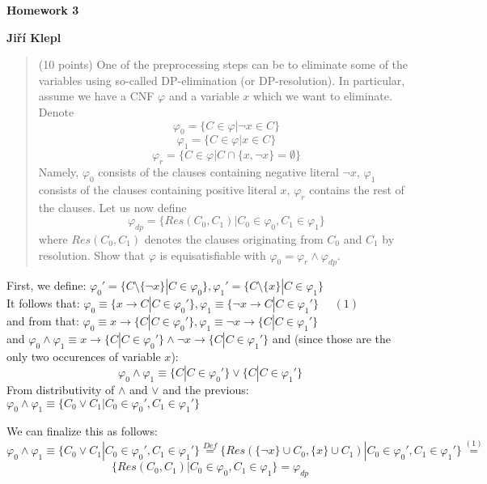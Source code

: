 \documentclass[a4paper,12pt]{article} %
\begin{document}
\begin{center}
    {\Large \bf Homework 3}
    \vspace{2mm}

    {\bf Jiří Klepl}

\end{center}

\vspace{0.4cm}

\begin{quote}
    (10 points) One of the preprocessing steps can be to eliminate some of the variables using so-called
DP-elimination (or DP-resolution). In particular, assume we have a CNF $\varphi$ and a variable $x$ which
we want to eliminate. Denote
$$\varphi_0 = \{C \in \varphi | \neg x \in C\}$$
$$\varphi_1 = \{C \in \varphi | x \in C\}$$
$$\varphi_r = \{C \in \varphi | C \cap \{x, \neg x\} = \emptyset\}$$
Namely, $\varphi_0$ consists of the clauses containing negative literal $\neg x$, $\varphi_1$ consists of the clauses containing
positive literal $x$, $\varphi_r$ contains the rest of the clauses. Let us now define
$$\varphi_{dp} = \{Res(C_0, C_1) | C_0 \in \varphi_0, C_1 \in \varphi_1\}$$
where $Res(C_0, C_1)$ denotes the clauses originating from $C_0$ and $C_1$ by resolution. Show that $\varphi$ is equisatisfiable with $\varphi_0 = \varphi_r \wedge \varphi_{dp}$.
\end{quote}

First, we define: $\varphi_0' = \{C \setminus \{\neg x\} | C \in \varphi_0\}, \varphi_1' = \{C \setminus \{x\} | C \in \varphi_1\}$ \\
It follows that: $\varphi_0 \equiv \{x \to C  | C \in \varphi_0'\}, \varphi_1 \equiv \{\neg x \to C | C \in \varphi_1'\}$ $\quad \left(1\right)$\\
and from that: $\varphi_0 \equiv x \to \{C  | C \in \varphi_0'\}, \varphi_1 \equiv \neg x \to \{C  | C \in \varphi_1'\}$ \\
and $\varphi_0 \wedge \varphi_1 \equiv x \to \{C  | C \in \varphi_0'\} \wedge \neg x \to \{C  | C \in \varphi_1'\}$
and (since those are the only two occurences of variable $x$):
$$\varphi_0 \wedge \varphi_1 \equiv \{C  | C \in \varphi_0'\} \vee \{C  | C \in \varphi_1'\}$$
From distributivity of $\wedge$ and $\vee$ and the previous: $\varphi_0 \wedge \varphi_1 \equiv \{C_0 \vee C_1 | C_0 \in \varphi_0', C_1 \in \varphi_1'\}$

We can finalize this as follows: $$\varphi_0 \wedge \varphi_1 \equiv \{C_0 \vee C_1 | C_0 \in \varphi_0', C_1 \in \varphi_1'\} \overset{Def}{=} \{Res(\{\neg x\} \cup C_0, \{x\} \cup C_1) | C_0 \in \varphi_0', C_1 \in \varphi_1'\} \overset{\left(1\right)}{=} $$
$$\{Res(C_0, C_1) | C_0 \in \varphi_0, C_1 \in \varphi_1\} = \varphi_{dp}$$
\end{document}

